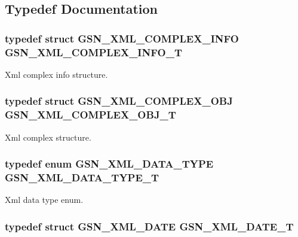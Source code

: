 \subsection{Typedef Documentation}
\hypertarget{a00679_gaa0d09c1190da464d384f10b95b4860eb}{
\subsubsection[{GSN\_\-XML\_\-COMPLEX\_\-INFO\_\-T}]{\setlength{\rightskip}{0pt plus 5cm}typedef struct {\bf GSN\_\-XML\_\-COMPLEX\_\-INFO} {\bf GSN\_\-XML\_\-COMPLEX\_\-INFO\_\-T}}}
\label{a00679_gaa0d09c1190da464d384f10b95b4860eb}


Xml complex info structure. 

\hypertarget{a00679_gacbfb0f478c8c0a699ae348b9ed1e5133}{
\subsubsection[{GSN\_\-XML\_\-COMPLEX\_\-OBJ\_\-T}]{\setlength{\rightskip}{0pt plus 5cm}typedef struct {\bf GSN\_\-XML\_\-COMPLEX\_\-OBJ} {\bf GSN\_\-XML\_\-COMPLEX\_\-OBJ\_\-T}}}
\label{a00679_gacbfb0f478c8c0a699ae348b9ed1e5133}


Xml complex structure. 

\hypertarget{a00679_ga481bc889c92734a49552fb759166b14a}{
\subsubsection[{GSN\_\-XML\_\-DATA\_\-TYPE\_\-T}]{\setlength{\rightskip}{0pt plus 5cm}typedef enum {\bf GSN\_\-XML\_\-DATA\_\-TYPE} {\bf GSN\_\-XML\_\-DATA\_\-TYPE\_\-T}}}
\label{a00679_ga481bc889c92734a49552fb759166b14a}


Xml data type enum. 

\hypertarget{a00679_ga3faa58b86cf0dbe597351c634a76b044}{
\subsubsection[{GSN\_\-XML\_\-DATE\_\-T}]{\setlength{\rightskip}{0pt plus 5cm}typedef struct {\bf GSN\_\-XML\_\-DATE} {\bf GSN\_\-XML\_\-DATE\_\-T}}}
\label{a00679_ga3faa58b86cf0dbe597351c634a76b044}


